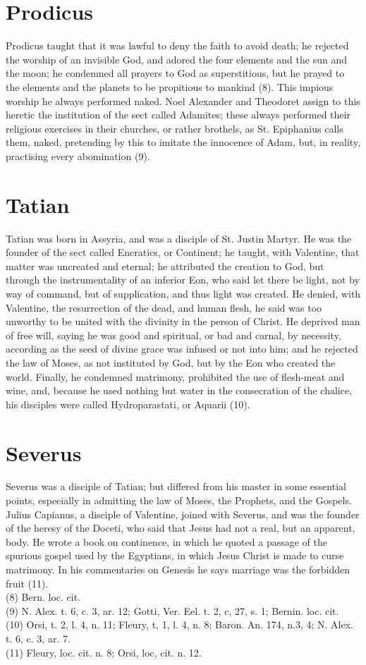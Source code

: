 \documentclass[12pt]{book}
\begin{document}
\section{Prodicus}
Prodicus taught that it was lawful to deny the faith to avoid death; he rejected the worship of an
invisible God, and adored the four elements and the sun and the moon; he condemned all prayers to God
as superstitious, but he prayed to the elements and the planets to be propitious to mankind (8). This
impious worship he always performed naked. Noel Alexander and Theodoret assign to this heretic the
institution of the sect called Adamites; these always performed their religious exercises in their churches,
or rather brothels, as St. Epiphanius calls them, naked, pretending by this to imitate the innocence of
Adam, but, in reality, practising every abomination (9).
\section{Tatian}
Tatian was born in Assyria, and was a disciple of St. Justin Martyr. He was the founder of the sect
called Encratics, or Continent; he taught, with Valentine, that matter was uncreated and eternal; he
attributed the creation to God, but through the instrumentality of an inferior Eon, who said let there be
light, not by way of command, but of supplication, and thus light was created. He denied, with Valentine,
the resurrection of the dead, and human flesh, he said was too unworthy to be united with the divinity in
the person of Christ. He deprived man of free will, saying he was good and spiritual, or bad and carnal,
by necessity, according as the seed of divine grace was infused or not into him; and he rejected the law of
Moses, as not instituted by God, but by the Eon who created the world. Finally, he condemned
matrimony, prohibited the use of flesh-meat and wine, and, because he used nothing but water in the
consecration of the chalice, his disciples were called Hydroparastati, or Aquarii (10).
\section{Severus}
Severus was a disciple of Tatian; but differed from his master in some essential points, especially in
admitting the law of Moses, the Prophets, and the Gospels. Julius Capianus, a disciple of Valentine,
joined with Severus, and was the founder of the heresy of the Doceti, who said that Jesus had not a real,
but an apparent, body. He wrote a book on continence, in which he quoted a passage of the spurious
gospel used by the Egyptians, in which Jesus Christ is made to curse matrimony. In his commentaries on
Genesis he says marriage was the forbidden fruit (11).\\
(8) Bern. loc. cit. \\
(9) N. Alex. t. 6, c. 3, ar. 12; Gotti, Ver. Eel. t. 2, c, 27, s. 1; Bernin. loc. cit.\\
(10) Orsi, t. 2, l. 4, n. 11; Fleury, t, 1, l. 4, n. 8; Baron. An. 174, n.3, 4; N. Alex. t. 6, c. 3, ar. 7. \\
(11) Fleury, loc. cit. n. 8; Orsi, loc, cit. n. 12.
\end{document}
